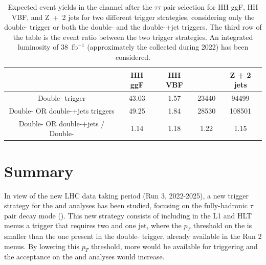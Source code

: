 \documentclass[../main.tex]{subfiles}
\begin{document}
\begin{table}[h!]
\begin{small}
\begin{center}
\begin{tabular}{c | c c c c}
                                                                             & HH ggF & HH VBF & \ttbar{} & Z + 2 jets \\\hline
Double-\tauh{} trigger                                                        & 43.03   & 1.57   & 23440 & 94499      \\
Double-\tauh{} OR double-\tauh{}+jets triggers                                & 49.25   & 1.84   & 28530  & 108501      \\
Double-\tauh{} OR double-\tauh{}+jets / Double-\tauh{}                        & 1.14   & 1.18   & 1.22  & 1.15      

\end{tabular}
\end{center}
\end{small}

\caption[Sensitivity increase with the new trigger strategy]{Expected event yields in the \tauh\tauh{} channel after the \hhbbtt{} $\tau\tau$ pair selection for HH ggF, HH VBF, \ttbar{} and Z~+~2 jets for two different trigger strategies, considering only the double-\tauh{} trigger or both the double-\tauh{} and the double-\tauh{}+jet triggers. The third row of the table is the event ratio between the two trigger strategies. An integrated luminosity of 38~fb${}^{-1}$ (approximately the collected during 2022) has been considered.}
\label{hh:tab:doubletaujet_sensitivity}
\end{table}

\section{Summary}

In view of the new LHC data taking period (Run 3, 2022-2025), a new trigger strategy for the \htt{} and \hhbbtt{} analyses has been studied, focusing on the fully-hadronic $\tau$ pair decay mode (\tauh\tauh{}). This new strategy consists of including in the L1 and HLT menus a trigger that requires two \tauh{} and one jet, where the $p_T$ threshold on the \tauh{} is smaller than the one present in the double-\tauh{} trigger, already available in the Run 2 menus. By lowering this $p_T$ threshold, more \tauh{} would be available for triggering and the acceptance on the \htt{} and \hhbbtt{} analyses would increase.
\end{document}
